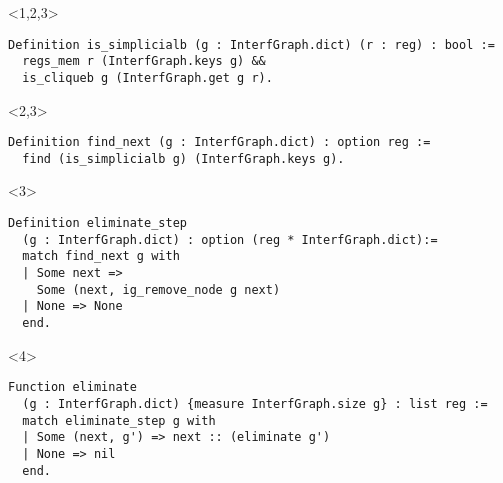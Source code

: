 
\begin{overlayarea}{\textwidth}{8cm}
\begin{onlyenv}<1,2,3>
\begin{lstlisting}[style=Rocq]
Definition is_simplicialb (g : InterfGraph.dict) (r : reg) : bool :=
  regs_mem r (InterfGraph.keys g) &&
  is_cliqueb g (InterfGraph.get g r).
\end{lstlisting}
\end{onlyenv}

\begin{onlyenv}<2,3>
\begin{lstlisting}[style=Rocq]
Definition find_next (g : InterfGraph.dict) : option reg :=
  find (is_simplicialb g) (InterfGraph.keys g).
\end{lstlisting}
\end{onlyenv}

\begin{onlyenv}<3>
\begin{lstlisting}[style=Rocq]
Definition eliminate_step
  (g : InterfGraph.dict) : option (reg * InterfGraph.dict):=
  match find_next g with
  | Some next =>
    Some (next, ig_remove_node g next)
  | None => None
  end.
\end{lstlisting}
\end{onlyenv}

\begin{onlyenv}<4>
\begin{lstlisting}[style=Rocq]
Function eliminate
  (g : InterfGraph.dict) {measure InterfGraph.size g} : list reg :=
  match eliminate_step g with
  | Some (next, g') => next :: (eliminate g')
  | None => nil
  end.
\end{lstlisting}
\end{onlyenv}
\end{overlayarea}